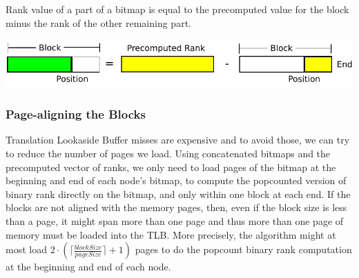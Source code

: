 \figureBegin
\caption{Rank value of a part of a bitmap is equal to the precomputed value for the block minus the rank of the other remaining part.}
\label{fig:PrecomputePopcountBlock}
\includegraphics[width=\textwidth]{PrecomputePopcountBlock.pdf}
\figureEnd








\subsubsection{Page-aligning the Blocks}
Translation Lookaside Buffer misses are expensive and to avoid those, we can try to reduce the number of pages we load.
Using concatenated bitmaps and the precomputed vector of ranks, we only need to load pages of the bitmap at the beginning and end of each node's bitmap, to compute the popcounted version of binary rank directly on the bitmap, and only within one block at each end.
If the blocks are not aligned with the memory pages, then, even if the block size is less than a page, it might span more than one page and thus more than one page of memory must be loaded into the TLB.
More precisely, the algorithm might at most load $2 \cdot \left( \lceil\frac{blockSize}{pageSize}\rceil +1 \right)$ pages to do the popcount binary rank computation at the beginning and end of each node.

